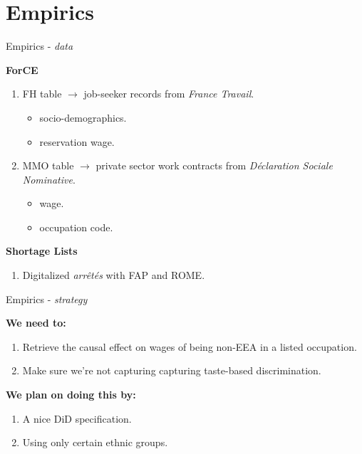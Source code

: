 \documentclass[aspectratio=169,10pt,xcolor={dvipsnames}]{beamer}
\begin{document}
\section*{Empirics}

\begin{frame}{Empirics - \textit{data}}

\alert{\textbf{ForCE}}   
   \begin{enumerate}
    \item FH table $\rightarrow$ job-seeker records from \textit{France Travail}.
        \begin{itemize}
            \item socio-demographics.
            \item reservation wage.
        \end{itemize}
    \item MMO table $\rightarrow$ private sector work contracts from \textit{Déclaration Sociale Nominative}.
    \begin{itemize}
            \item wage.
            \item occupation code.
        \end{itemize}
   \end{enumerate}

\vspace{0.2cm}

\alert{\textbf{Shortage Lists}} 
 \begin{enumerate}
    \item Digitalized \textit{arrêtés} with FAP and ROME. 
   \end{enumerate}
\end{frame}


\begin{frame}{Empirics - \textit{strategy}}

\alert{\textbf{We need to:}}
\begin{enumerate}
	\item Retrieve the causal effect on wages of being non-EEA in a listed occupation. 
	\item Make sure we're not capturing capturing taste-based discrimination. 
\end{enumerate}
\vspace{0.4cm}
\alert{\textbf{We plan on doing this by:}}
\begin{enumerate}
	\item A nice DiD specification.
	\item Using only certain ethnic groups.
\end{enumerate}
\end{frame}
\end{document}
